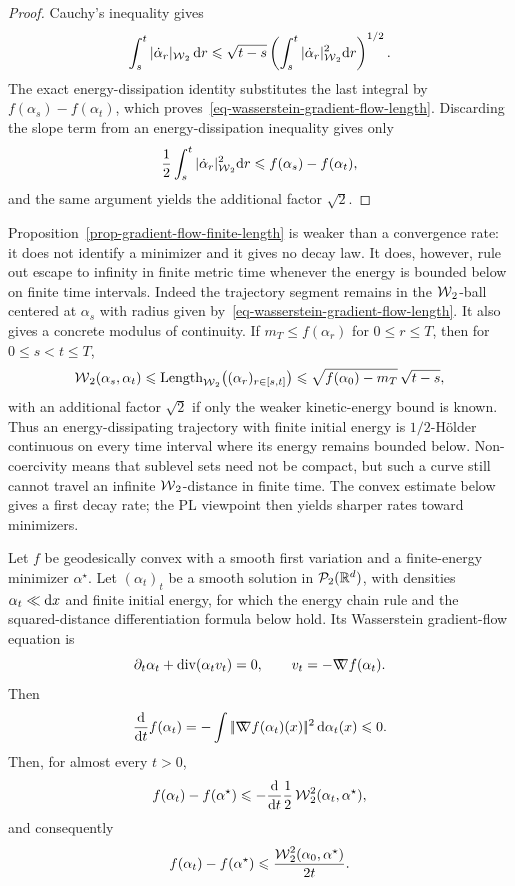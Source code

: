 \begin{proof}
	Cauchy's inequality gives
	\[
		\int_s^t |\dot\alpha_r|_{\operatorname{\mathcal{W}}_2}\,\mathrm{d} r
		\leqslant
		\sqrt{t-s}
		\left(\int_s^t |\dot\alpha_r|_{\operatorname{\mathcal{W}}_2}^2\mathrm{d} r\right)^{1/2}.
	\]
	The exact energy-dissipation identity substitutes the last integral by $f(\alpha_s)-f(\alpha_t)$, which proves~\eqref{eq-wasserstein-gradient-flow-length}. Discarding the slope term from an energy-dissipation inequality gives only
	\[
		\frac12\int_s^t |\dot\alpha_r|_{\operatorname{\mathcal{W}}_2}^2\mathrm{d} r
		\leqslant
		f(\alpha_s)-f(\alpha_t),
	\]
	and the same argument yields the additional factor $\sqrt2$.
\end{proof}

Proposition~\ref{prop-gradient-flow-finite-length} is weaker than a convergence rate: it does not identify a minimizer and it gives no decay law. It does, however, rule out escape to infinity in finite metric time whenever the energy is bounded below on finite time intervals. Indeed the trajectory segment remains in the \(\operatorname{\mathcal{W}}_2\)-ball centered at \(\alpha_s\) with radius given by~\eqref{eq-wasserstein-gradient-flow-length}. It also gives a concrete modulus of continuity. If \(m_T\leq f(\alpha_r)\) for \(0\leq r\leq T\), then for \(0\leq s<t\leq T\),
\[
	\operatorname{\mathcal{W}}_2(\alpha_s,\alpha_t)
	\leqslant
	\operatorname{Length}_{\operatorname{\mathcal{W}}_2}\bigl((\alpha_r)_{r\in[s,t]}\bigr)
	\leqslant
	\sqrt{f(\alpha_0)-m_T}\,\sqrt{t-s},
\]
with an additional factor \(\sqrt2\) if only the weaker kinetic-energy bound is known. Thus an energy-dissipating trajectory with finite initial energy is \(1/2\)-H\"older continuous on every time interval where its energy remains bounded below. Non-coercivity means that sublevel sets need not be compact, but such a curve still cannot travel an infinite \(\operatorname{\mathcal{W}}_2\)-distance in finite time. The convex estimate below gives a first decay rate; the PL viewpoint then yields sharper rates toward minimizers.

\begin{prop}\label{prop-convex-wass-flow-rate}
	Let \(f\) be geodesically convex with a smooth first variation and a finite-energy minimizer \(\alpha^\star\). Let \((\alpha_t)_t\) be a smooth solution in $\mathcal{P}_2(\mathbb{R}^d)$, with densities $\alpha_t\ll\mathrm{d} x$ and finite initial energy, for which the energy chain rule and the squared-distance differentiation formula below hold. Its Wasserstein gradient-flow equation is
	\[
		\partial_t\alpha_t+\operatorname{div}(\alpha_t v_t)=0,
		\qquad
		v_t=-\mathord{\nabla\mkern-9.3mu\nabla} f(\alpha_t).
	\]
	Then
	\[
		\frac{\mathrm{d}}{\mathrm{d} t} f(\alpha_t)
		=
		-\int |\!| \mathord{\nabla\mkern-9.3mu\nabla} f(\alpha_t)(x) |\!|^2\,\mathrm{d}\alpha_t(x)
		\leqslant 0.
	\]
	Then, for almost every $t>0$,
	\[
		f(\alpha_t)-f(\alpha^\star)
		\leqslant
		-\frac{\mathrm{d}}{\mathrm{d} t}\frac12 \operatorname{\mathcal{W}}_2^2(\alpha_t,\alpha^\star),
	\]
	and consequently
	\[
		f(\alpha_t)-f(\alpha^\star)
		\leqslant
		\frac{\operatorname{\mathcal{W}}_2^2(\alpha_0,\alpha^\star)}{2t}.
	\]
\end{prop}

